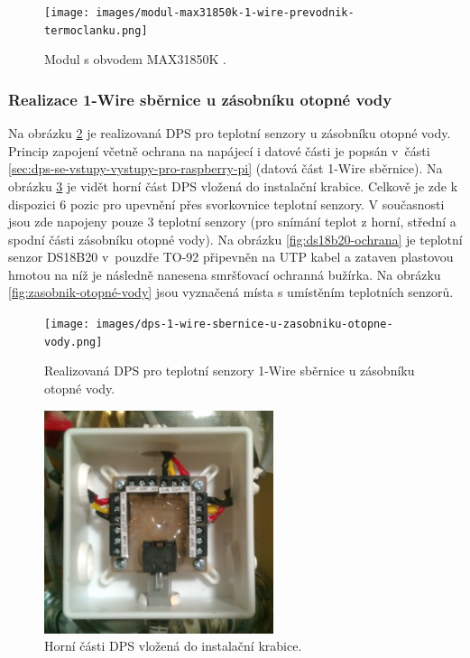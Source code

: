 \begin{figure}[H]
    \centering
    \texttt{[image: images/modul-max31850k-1-wire-prevodnik-termoclanku.png]}
    \caption[Modul s obvodem MAX31850K.]{Modul s obvodem MAX31850K \cite{prevodnik-max31850k}.}
    \label{fig:modul-max31850k-1-wire-prevodnik-termoclanku}
\end{figure}

\subsubsection{Realizace 1-Wire sběrnice u zásobníku otopné vody}
Na obrázku \ref{fig:dps-1-wire-sbernice-u-zasobniku-otopne-vody} je realizovaná DPS pro teplotní senzory u zásobníku otopné vody. Princip zapojení včetně ochrana na napájecí i datové části je popsán v~části \ref{sec:dps-se-vstupy-vystupy-pro-raspberry-pi} (datová část 1-Wire sběrnice). Na obrázku \ref{fig:instalacni-krabice-cidla-u-zasobniku-otopne-vody} je vidět horní část DPS vložená do instalační krabice. Celkově je zde k dispozici 6 pozic pro upevnění přes svorkovnice teplotní senzory. V současnosti jsou zde napojeny pouze 3 teplotní senzory (pro snímání teplot z horní, střední a spodní části zásobníku otopné vody). Na obrázku \ref{fig:ds18b20-ochrana} je teplotní senzor DS18B20 v~pouzdře TO-92 připevněn na UTP kabel a zataven plastovou hmotou na níž je následně nanesena smršťovací ochranná bužírka. Na obrázku \ref{fig:zasobnik-otopné-vody} jsou vyznačená místa s umístěním teplotních senzorů.

\begin{figure}[H]
    \centering
    \texttt{[image: images/dps-1-wire-sbernice-u-zasobniku-otopne-vody.png]}
    \caption{Realizovaná DPS pro teplotní senzory 1-Wire sběrnice u zásobníku otopné vody.}
    \label{fig:dps-1-wire-sbernice-u-zasobniku-otopne-vody}
\end{figure}

\begin{figure}[H]
    \centering
    \includegraphics[width=0.6\textwidth]{images/instalacni-krabice-cidla-u-zasobniku-otopne-vody.png}
    \caption{Horní části DPS vložená do instalační krabice.}
    \label{fig:instalacni-krabice-cidla-u-zasobniku-otopne-vody}
\end{figure}

